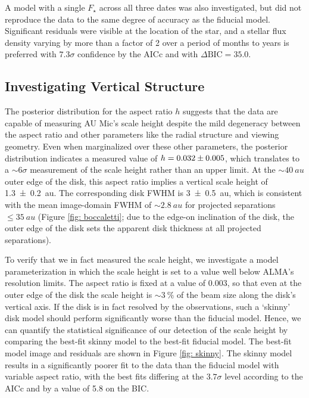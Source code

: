 \documentclass[modern]{aastex62}
\begin{document}
A model with a single $F_\star$ across all three dates was also investigated, but did not reproduce the data to the same degree of accuracy as the fiducial model.
Significant residuals were visible at the location of the star, and  a stellar flux density varying by more than a factor of 2 over a period of months to years is preferred with $7.3 \sigma$ confidence by the AICc and with $\Delta \text{BIC} = 35.0$.

\subsection{Investigating Vertical Structure}
\label{subsection: vertical analysis}

The posterior distribution for the aspect ratio $h$ suggests that the data are capable of measuring AU Mic's scale height despite the mild degeneracy between the aspect ratio and other parameters like the radial structure and viewing geometry.  
Even when marginalized over these other parameters, the posterior distribution indicates a measured value of $h=\num{0.032 \pm 0.005}$, which translates to a $\sim 6 \sigma$ measurement of the scale height rather than an upper limit.
At the $\sim \SI{40}{au}$ outer edge of the disk, this aspect ratio implies a vertical scale height of \SI{1.3 \pm 0.2}{au}. 
The corresponding disk FWHM is \SI{3 \pm 0.5}{au}, which is consistent with the mean image-domain FWHM of $\sim \SI{2.8}{au}$ for projected separations $\leq \SI{35}{au}$ (Figure \ref{fig: boccaletti}; due to the edge-on inclination of the disk, the outer edge of the disk sets the apparent disk thickness at all projected separations).

To verify that we in fact measured the scale height, we investigate a model parameterization in which the scale height is set to a value well below ALMA's resolution limits.
The aspect ratio is fixed at a value of $0.003$, so that even at the outer edge of the disk the scale height is $\sim \SI{3}{\percent}$ of the beam size along the disk's vertical axis.
If the disk is in fact resolved by the observations, such a `skinny' disk model should perform significantly worse than the fiducial model.
Hence, we can quantify the statistical significance of our detection of the scale height by comparing the best-fit skinny model to the best-fit fiducial model.
The best-fit model image and residuals are shown in Figure \ref{fig: skinny}.
The skinny model results in a significantly poorer fit to the data than the fiducial model with variable aspect ratio, with the best fits differing at the $3.7 \sigma$ level according to the AICc and by a value of 5.8 on the BIC.
\end{document}
